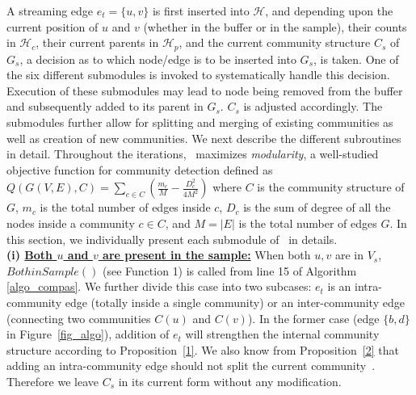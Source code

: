 A streaming edge $e_t=\{u,v\}$ is first inserted into  $\mathcal{H}$, and depending upon the current position of $u$ and $v$ (whether in the buffer or in the sample), their counts in $\mathcal{H}_c$, their current parents in $\mathcal{H}_p$, and the current community structure $C_s$ of $G_s$, a decision as to which node/edge is to be inserted into $G_s$, is taken. 
One of the six different submodules is invoked to systematically handle this decision. Execution of these submodules may lead to node being removed from the buffer and subsequently added to its parent in $G_s$. $C_s$ is adjusted accordingly. 
The submodules further allow for splitting and merging of existing communities as well as creation of new communities.
We next describe the different subroutines in detail.
Throughout the iterations, \compas~maximizes {\em modularity}, a well-studied objective function for community detection defined as 
{\small $Q(G(V,E),C)=\sum_{c\in C} (\frac{m_c}{M} - \frac{D_c^2}{4M^2})$}
where $C$ is the community structure of $G$, $m_c$ is the total number of edges inside $c$, $D_c$ is the sum of degree of all the nodes inside a community $c\in C$, and $M=|E|$ is the total number of edges $G$. In this section, we individually present each submodule of \compas~in details.\\
\noindent\textbf{(i) \underline{Both $u$ and $v$ are present in the sample:}} When both $u,v$ are in $V_s$, $BothinSample()$ (see Function 1) is called from line 15 of Algorithm \ref{algo_compas}.  We further divide this case into two subcases: $e_t$ is an intra-community edge (totally inside a single community) or an inter-community edge (connecting two communities $C(u)$ and $C(v)$). In the former case (edge $\{b,d\}$  in Figure~\ref{fig_algo}), addition of $e_t$ will strengthen the internal community structure according to Proposition~\ref{1}. We also know from Proposition~\ref{2} that adding an intra-community edge should not split the current community~\cite{PhysRevE.78.046115}. Therefore we leave $C_s$ in its current form without any modification.
